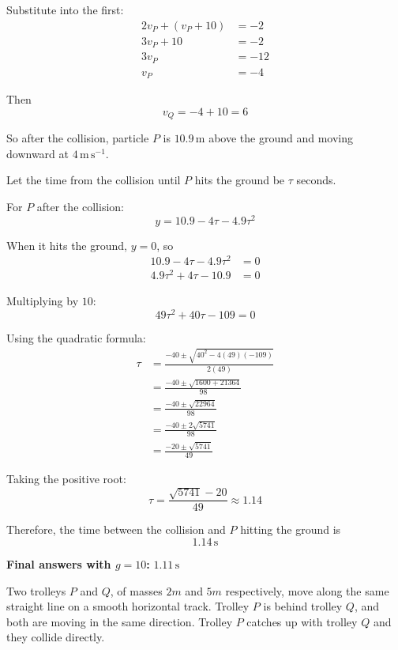 \documentclass[leqno]{article}
\begin{document}
\begin{enumerate}[
  label=\textbf{\arabic*.},
  leftmargin=*,
  topsep=0pt,
  partopsep=0pt,
  parsep=0pt
]
\begin{djsSolution}
Substitute into the first:
\begin{align*}
2v_P+(v_P+10)&=-2 \\
3v_P+10&=-2 \\
3v_P&=-12 \\
v_P&=-4
\end{align*}

Then
\[
v_Q= -4+10=6
\]

So after the collision, particle \(P\) is \(10.9\,\mathrm{m}\) above the ground and moving downward at \(4\,\mathrm{m\,s^{-1}}\).

Let the time from the collision until \(P\) hits the ground be \(\tau\) seconds.

For \(P\) after the collision:
\[
y = 10.9-4\tau-4.9\tau^2
\]

When it hits the ground, \(y=0\), so
\begin{align*}
10.9-4\tau-4.9\tau^2&=0 \\
4.9\tau^2+4\tau-10.9&=0
\end{align*}

Multiplying by \(10\):
\[
49\tau^2+40\tau-109=0
\]

Using the quadratic formula:
\begin{align*}
\tau &= \frac{-40\pm\sqrt{40^2-4(49)(-109)}}{2(49)} \\
&= \frac{-40\pm\sqrt{1600+21364}}{98} \\
&= \frac{-40\pm\sqrt{22964}}{98} \\
&= \frac{-40\pm 2\sqrt{5741}}{98} \\
&= \frac{-20\pm \sqrt{5741}}{49}
\end{align*}

Taking the positive root:
\[
\tau=\frac{\sqrt{5741}-20}{49}\approx 1.14
\]

Therefore, the time between the collision and \(P\) hitting the ground is
\[
1.14\,\mathrm{s}
\]

\par\medskip\noindent\textbf{Final answers with \(g = 10\):} \(1.11\,\mathrm{s}\)
\end{djsSolution}


\newpage

\questionitem

Two trolleys $P$ and $Q$, of masses $2m$ and $5m$ respectively, move along the same straight line on a smooth horizontal track. Trolley $P$ is behind trolley $Q$, and both are moving in the same direction. Trolley $P$ catches up with trolley $Q$ and they collide directly. \\


\end{enumerate}
\end{document}
